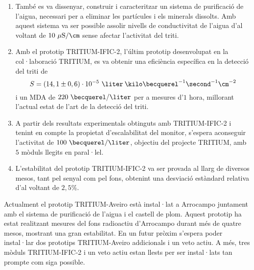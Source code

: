 \begin{enumerate}
\item{} També es va dissenyar, construir i caracteritzar un sistema de purificació de l'aigua, necessari per a eliminar les partícules i els minerals dissolts. Amb aquest sistema va ser possible assolir nivells de conductivitat de l'aigua d'al voltant de $10~\mu\text{S}/\cm$ sense afectar l'activitat del triti.

\item{} Amb el prototip TRITIUM-IFIC-2, l'últim prototip desenvolupat en la col·laboració TRITIUM, es va obtenir una eficiència específica en la detecció del triti de
$$S = (14,1 \pm 0,6)\cdot{} 10^{-5}~\liter\:\kilo\becquerel^{-1}\second^{-1}\cm^{-2}$$
i un MDA de $220~\becquerel/\liter$ per a mesures d'$1$ hora, millorant l'actual estat de l'art de la detecció del triti.

\item{} A partir dels resultats experimentals obtinguts amb TRITIUM-IFIC-2 i tenint en compte la propietat d'escalabilitat del monitor, s'espera aconseguir l'activitat de $100~\becquerel/\liter$, objectiu del projecte TRITIUM, amb $5$ mòduls llegits en paral·lel.

\item{} L'estabilitat del prototip TRITIUM-IFIC-2 va ser provada al llarg de diversos mesos, tant pel senyal com pel fons, obtenint una desviació estàndard relativa d'al voltant de $2,5\%$.

\end{enumerate}

Actualment el prototip TRITIUM-Aveiro està instal·lat a Arrocampo juntament amb el sistema de purificació de l'aigua i el castell de plom. Aquest prototip ha estat realitzant mesures del fons radioactiu d'Arrocampo durant més de quatre mesos, mostrant una gran estabilitat. En un futur pròxim s'espera poder instal·lar dos prototips TRITIUM-Aveiro addicionals i un veto actiu. A més, tres mòduls TRITIUM-IFIC-2 i un veto actiu estan llests per ser instal·lats tan prompte com siga possible.